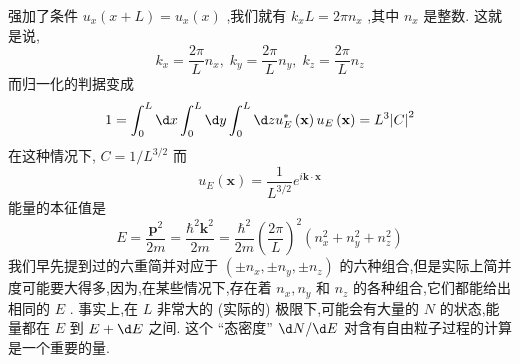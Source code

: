 \documentclass[lang=cn,newtx,10pt,scheme=chinese,thmcnt=section]{elegantbook}
\begin{document}
强加了条件 ${u}_{x}\left( {x + L}\right) = {u}_{x}\left( x\right)$ ,我们就有 ${k}_{x}L = {2\pi }{n}_{x}$ ,其中 ${n}_{x}$ 是整数. 这就是说,
\begin{equation}
	{k}_{x} = \frac{2\pi }{L}{n}_{x},\;{k}_{y} = \frac{2\pi }{L}{n}_{y},\;{k}_{z} = \frac{2\pi }{L}{n}_{z}
\end{equation}
而归一化的判据变成
\begin{equation}
	1 = \int_{0}^{L}{\d x}\int_{0}^{L}{\d y}\int_{0}^{L}{\d z}{u}_{E}^{ * }\left( \mathbf{x}\right) {u}_{E}\left( \mathbf{x}\right) = {L}^{3}{\left| C\right| }^{2}
\end{equation}
在这种情况下, $C = 1/{L}^{3/2}$ 而
\begin{equation}
	{u}_{E}\left( \mathbf{x}\right) = \frac{1}{{L}^{3/2}}{e}^{i\mathbf{k} \cdot \mathbf{x}}
\end{equation}
能量的本征值是
\begin{equation}
	E = \frac{{\mathbf{p}}^{2}}{2m} = \frac{{\hbar }^{2}{\mathbf{k}}^{2}}{2m} = \frac{{\hbar }^{2}}{2m}{\left( \frac{2\pi }{L}\right) }^{2}\left( {{n}_{x}^{2} + {n}_{y}^{2} + {n}_{z}^{2}}\right)
\end{equation}
我们早先提到过的六重简并对应于 $\left( {\pm {n}_{x}, \pm {n}_{y}, \pm {n}_{z}}\right)$ 的六种组合,但是实际上简并度可能要大得多,因为,在某些情况下,存在着 ${n}_{x},{n}_{y}$ 和 ${n}_{z}$ 的各种组合,它们都能给出相同的 $E$ . 事实上,在 $L$ 非常大的 (实际的) 极限下,可能会有大量的 $N$ 的状态,能量都在 $E$ 到 $E + {\d E}$ 之间. 这个 “态密度” ${\d N}/{\d E}$ 对含有自由粒子过程的计算是一个重要的量.
\end{document}
